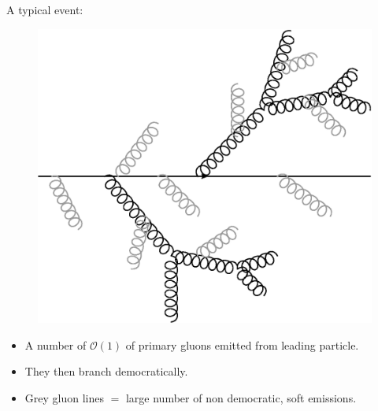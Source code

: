 \documentclass[pstricks,mathserif]{beamer}
\begin{document}
\begin{frame}
A typical event:
\begin{figure}
\begin{center}
\includegraphics[width=0.5\linewidth]{democraticbranch.eps}
\end{center}
\end{figure}
%
\begin{itemize}
\small
\item A number of $\mathcal{O}(1)$ of primary gluons emitted from leading particle.
\item They then branch democratically.
\item Grey gluon lines $=$ large number of non democratic, soft emissions.
\end{itemize}
%
%
\end{frame}
\end{document}
